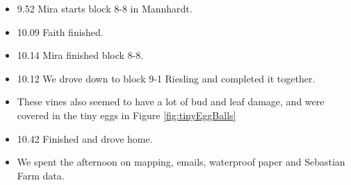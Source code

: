 \documentclass[11pt,letter]{article}
\newenvironment{smitemize}{
\begin{itemize}
  \setlength{\itemsep}{0pt}
  \setlength{\parskip}{0.8pt}
  \setlength{\parsep}{0pt}}
{\end{itemize}
}
\begin{document}
\begin{smitemize}
\item 9.52 Mira starts block 8-8 in Mannhardt.
\item 10.09 Faith finished. 
\item 10.14 Mira finished block 8-8.
\item 10.12 We drove down to block 9-1 Riesling and completed it together. 
\item These vines also seemed to have a lot of bud and leaf damage, and were covered in the tiny eggs in Figure \ref{fig:tinyEggBalls}
\item 10.42 Finished and drove home. 
\item We spent the afternoon on mapping, emails, waterproof paper and Sebastian Farm data.

\end{smitemize}
\end{document}

